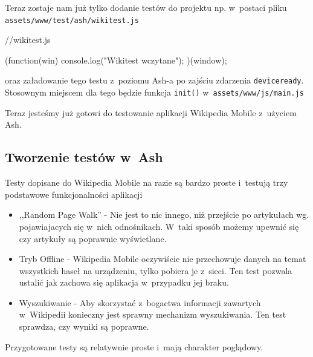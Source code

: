 \documentclass[brudnopis]{xmgr}
\begin{document}
Teraz zostaje nam już tylko dodanie testów do projektu np. w~postaci pliku  \texttt{assets/www/test/ash/wikitest.js} 

\begin{javascriptcode}
   //wikitest.js

  (function(win){  
    console.log("Wikitest wczytane");
  })(window);
\end{javascriptcode}

oraz załadowanie tego testu z~poziomu Ash-a po zajściu zdarzenia \texttt{deviceready}. Stosownym miejscem dla tego będzie funkcja \texttt{init()} w~\texttt{assets/www/js/main.js}


Teraz jesteśmy już gotowi do testowanie aplikacji Wikipedia Mobile z~użyciem Ash.

\subsection{Tworzenie testów w~Ash}

Testy dopisane do Wikipedia Mobile na razie są bardzo proste i~testują trzy podstawowe funkcjonalności aplikacji 

\begin{itemize}
  \item ,,Random Page Walk'' - Nie jest to nic innego, niż przejście po artykułach wg. pojawiajacych się w~nich odnośnikach. W~taki sposób możemy upewnić się czy artykuły są poprawnie wyświetlane.
  \item Tryb Offline - Wikipedia Mobile oczywiście nie przechowuje danych na temat wszystkich haseł na urządzeniu, tylko pobiera je z~sieci. Ten test pozwala ustalić jak zachowa się aplikacja w~przypadku jej braku.
  \item Wyszukiwanie - Aby skorzystać z~bogactwa informacji zawartych w~Wikipedii konieczny jest sprawny mechanizm wyszukiwania. Ten test sprawdza, czy wyniki są poprawne.  
\end{itemize}

Przygotowane testy są relatywnie proste i~mają charakter poglądowy. 
\end{document}
